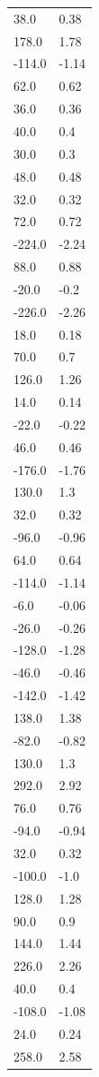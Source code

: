 \begin{longtable}{ll}
38.0 & 0.38 \\
178.0 & 1.78 \\
-114.0 & -1.14 \\
62.0 & 0.62 \\
36.0 & 0.36 \\
40.0 & 0.4 \\
30.0 & 0.3 \\
48.0 & 0.48 \\
32.0 & 0.32 \\
72.0 & 0.72 \\
-224.0 & -2.24 \\
88.0 & 0.88 \\
-20.0 & -0.2 \\
-226.0 & -2.26 \\
18.0 & 0.18 \\
70.0 & 0.7 \\
126.0 & 1.26 \\
14.0 & 0.14 \\
-22.0 & -0.22 \\
46.0 & 0.46 \\
-176.0 & -1.76 \\
130.0 & 1.3 \\
32.0 & 0.32 \\
-96.0 & -0.96 \\
64.0 & 0.64 \\
-114.0 & -1.14 \\
-6.0 & -0.06 \\
-26.0 & -0.26 \\
-128.0 & -1.28 \\
-46.0 & -0.46 \\
-142.0 & -1.42 \\
138.0 & 1.38 \\
-82.0 & -0.82 \\
130.0 & 1.3 \\
292.0 & 2.92 \\
76.0 & 0.76 \\
-94.0 & -0.94 \\
32.0 & 0.32 \\
-100.0 & -1.0 \\
128.0 & 1.28 \\
90.0 & 0.9 \\
144.0 & 1.44 \\
226.0 & 2.26 \\
40.0 & 0.4 \\
-108.0 & -1.08 \\
24.0 & 0.24 \\
258.0 & 2.58 \\

\end{longtable}
